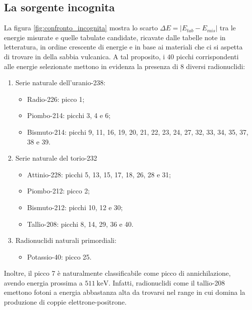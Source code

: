 \documentclass{article}
\begin{document}
        \subsection*{La sorgente incognita}
            La figura \ref{fig:confronto_incognita} mostra lo scarto $\Delta E=|E_{tab}-E_{mis}|$ tra le energie misurate e quelle tabulate candidate, ricavate dalle tabelle note in letteratura, in ordine crescente di energie e in base ai materiali che ci si aspetta di trovare in della sabbia vulcanica. A tal proposito, i $40$ picchi corrispondenti alle energie selezionate mettono in evidenza la presenza di $8$ diversi radionuclidi:
            \begin{enumerate}
                \item Serie naturale dell'uranio-238:
                \begin{itemize}
                    \item Radio-226: picco 1;
                    \item Piombo-214: picchi 3, 4 e 6;
                    \item Bismuto-214: picchi 9, 11, 16, 19, 20, 21, 22, 23, 24, 27, 32, 33, 34, 35, 37, 38 e 39.
                \end{itemize}
                \item Serie naturale del torio-232
                \begin{itemize}
                    \item Attinio-228: picchi 5, 13, 15, 17, 18, 26, 28 e 31;
                    \item Piombo-212: picco 2;
                    \item Bismuto-212: picchi 10, 12 e 30;
                    \item Tallio-208: picchi 8, 14, 29, 36 e 40.
                \end{itemize}
                \item Radionuclidi naturali primordiali:
                \begin{itemize}
                    \item Potassio-40: picco 25.
                \end{itemize}
            \end{enumerate}

            Inoltre, il picco 7 è naturalmente classificabile come picco di annichilazione, avendo energia prossima a $\SI{511}{\kilo\electronvolt}$. Infatti, radionuclidi come il tallio-208 emettono fotoni a energia abbastanza alta da trovarsi nel range in cui domina la produzione di coppie elettrone-positrone.
\end{document}
